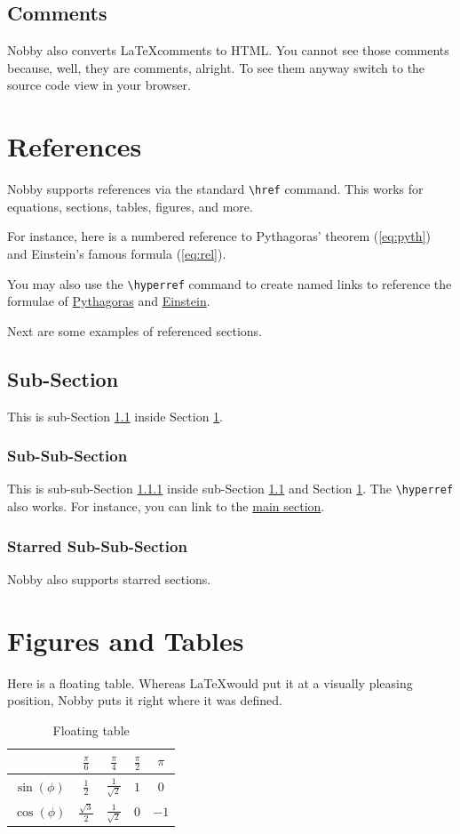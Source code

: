 \documentclass[10pt]{article}
\begin{document}
\subsection{Comments}
Nobby also converts \LaTeX comments to HTML. You cannot see those
comments because, well, they are comments, alright. To see them anyway
switch to the source code view in your browser.

\section{References}
\label{sec:ref}
Nobby supports references via the standard \texttt{\textbackslash{href}}
command. This works for equations, sections, tables, figures, and
more.

For instance, here is a numbered reference to Pythagoras' theorem
(\ref{eq:pyth}) and Einstein's famous formula (\ref{eq:rel}).

You may also use the \texttt{\textbackslash{hyperref}} command to
create named links to reference the formulae of
\hyperref[eq:pyth]{Pythagoras} and \hyperref[eq:rel]{Einstein}.

Next are some examples of referenced sections.

\subsection{Sub-Section}
\label{ss:1}
This is sub-Section \ref{ss:1} inside Section \ref{sec:ref}.

\subsubsection{Sub-Sub-Section}
\label{sss:1}
This is sub-sub-Section \ref{sss:1} inside sub-Section \ref{ss:1} and
Section \ref{sec:ref}. The \texttt{\textbackslash{hyperref}} also
works. For instance, you can link to the \hyperref[sec:ref]{main section}.

\subsubsection*{Starred Sub-Sub-Section}
Nobby also supports starred sections.

\section{Figures and Tables}
Here is a floating table. Whereas  \LaTeX would put it at a visually
pleasing position, Nobby puts it right where it was defined.
\begin{table}
  \centering
  \begin{tabular}{c | c c c c}
    & $\frac{\pi}{6}$& $\frac{\pi}{4}$& $\frac{\pi}{2}$ & $\pi$\\[1mm]
    \hline
    \rule{0cm}{4mm}$\sin(\phi)$& $\frac{1}{2}$ & $\frac{1}{\sqrt{2}}$& $1$ & $0$\\
    \rule{0cm}{4mm}$\cos(\phi)$& $\frac{\sqrt{3}}{2}$ & $\frac{1}{\sqrt{2}}$& $0$&$-1$
  \end{tabular}
  \caption{Floating table}
\end{table}
\end{document}

